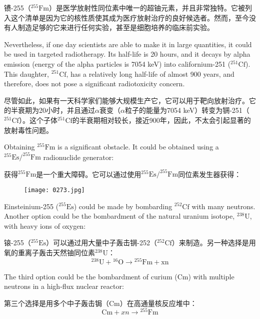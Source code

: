 \documentclass[dvipsnames, svgnames,a4paper,11pt]{article}
\begin{document}
镄-255（\(\mathrm{^{255}Fm}\)）是医学放射性同位素中唯一的超铀元素，并且非常独特。它被列入这个清单是因为它的核性质使其成为医疗放射治疗的良好候选者。然而，至今没有人制造足够的它来进行任何实验，甚至是细胞培养的临床前实验。  

Nevertheless, if one day scientists are able to make it in large quantities, it could be used in targeted radiotherapy. Its half-life is 20 hours, and it decays by alpha emission (energy of the alpha particles is 7054 keV) into californium-251 (\(\mathrm{^{251}Cf}\)). This daughter, \(\mathrm{^{251}Cf}\), has a relatively long half-life of almost 900 years, and therefore, does not pose a significant radiotoxicity concern.  

尽管如此，如果有一天科学家们能够大规模生产它，它可以用于靶向放射治疗。它的半衰期为20小时，并且通过$\alpha$衰变（$\alpha$粒子的能量为7054 keV）转变为锎-251（\(\mathrm{^{251}Cf}\)）。这个子体\(\mathrm{^{251}Cf}\)的半衰期相对较长，接近900年，因此，不太会引起显著的放射毒性问题。  

Obtaining \(\mathrm{^{255}Fm}\) is a significant obstacle. It could be obtained using a \(\mathrm{^{255}Es/^{255}Fm}\) radionuclide generator:  

获得\(\mathrm{^{255}Fm}\)是一个重大障碍。它可以通过使用\(\mathrm{^{255}Es/^{255}Fm}\)同位素发生器获得：  

\begin{figure}[h]
	\centering
    \texttt{[image: 0273.jpg]}  
     \label{fig370}
\end{figure}

Einsteinium-255 (\(\mathrm{^{255}Es}\)) could be made by bombarding \(\mathrm{^{252}Cf}\) with many neutrons. Another option could be the bombardment of the natural uranium isotope, \(\mathrm{^{238}U}\), with heavy ions of oxygen:  



锿-255（\(\mathrm{^{255}Es}\)）可以通过用大量中子轰击锎-252（\(\mathrm{^{252}Cf}\)）来制造。另一种选择是用氧的重离子轰击天然铀同位素\(\mathrm{^{238}U}\)：  
\[
\mathrm{^{238}U + {}^{16}O \to {}^{255}Fm + xn}
\]

The third option could be the bombardment of curium (\(\mathrm{Cm}\)) with multiple neutrons in a high-flux nuclear reactor:  

第三个选择是用多个中子轰击锔（\(\mathrm{Cm}\)）在高通量核反应堆中：  
\[
\mathrm{Cm} + xn \to \mathrm{{}^{255}Fm}
\]
\end{document}
